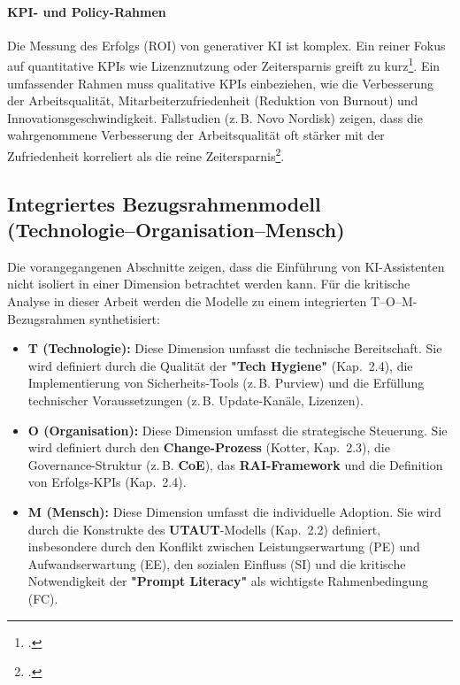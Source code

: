 \documentclass[12pt,a4paper,oneside]{article} %
\begin{document}
\paragraph{KPI- und Policy-Rahmen}
Die Messung des Erfolgs (ROI) von generativer KI ist komplex. Ein reiner Fokus auf quantitative KPIs wie Lizenznutzung oder Zeitersparnis greift zu kurz\footcite{Medium2025ROIPlaybook}. Ein umfassender Rahmen muss qualitative KPIs einbeziehen, wie die Verbesserung der Arbeitsqualität, Mitarbeiterzufriedenheit (Reduktion von Burnout) und Innovationsgeschwindigkeit. Fallstudien (z.\,B. Novo Nordisk) zeigen, dass die wahrgenommene Verbesserung der Arbeitsqualität oft stärker mit der Zufriedenheit korreliert als die reine Zeitersparnis\footcite{SloanReview2025ScaleGenAI}.

\subsection{Integriertes Bezugsrahmenmodell \newline(Technologie–Organisation–Mensch)}
Die vorangegangenen Abschnitte zeigen, dass die Einführung von KI-Assistenten nicht isoliert in einer Dimension betrachtet werden kann. Für die kritische Analyse in dieser Arbeit werden die Modelle zu einem integrierten T–O–M-Bezugsrahmen synthetisiert:

\begin{itemize}
    \item \textbf{T (Technologie):} Diese Dimension umfasst die technische Bereitschaft. Sie wird definiert durch die Qualität der \textbf{"Tech Hygiene"} (Kap.~2.4), die Implementierung von Sicherheits-Tools (z.\,B. Purview) und die Erfüllung technischer Voraussetzungen (z.\,B. Update-Kanäle, Lizenzen).
    \item \textbf{O (Organisation):} Diese Dimension umfasst die strategische Steuerung. Sie wird definiert durch den \textbf{Change-Prozess} (Kotter, Kap.~2.3), die Governance-Struktur (z.\,B. \textbf{CoE}), das \textbf{RAI-Framework} und die Definition von Erfolgs-KPIs (Kap.~2.4).
    \item \textbf{M (Mensch):} Diese Dimension umfasst die individuelle Adoption. Sie wird durch die Konstrukte des \textbf{UTAUT}-Modells (Kap.~2.2) definiert, insbesondere durch den Konflikt zwischen Leistungserwartung (PE) und Aufwandserwartung (EE), den sozialen Einfluss (SI) und die kritische Notwendigkeit der \textbf{"Prompt Literacy"} als wichtigste Rahmenbedingung (FC).
\end{itemize}
\end{document}
